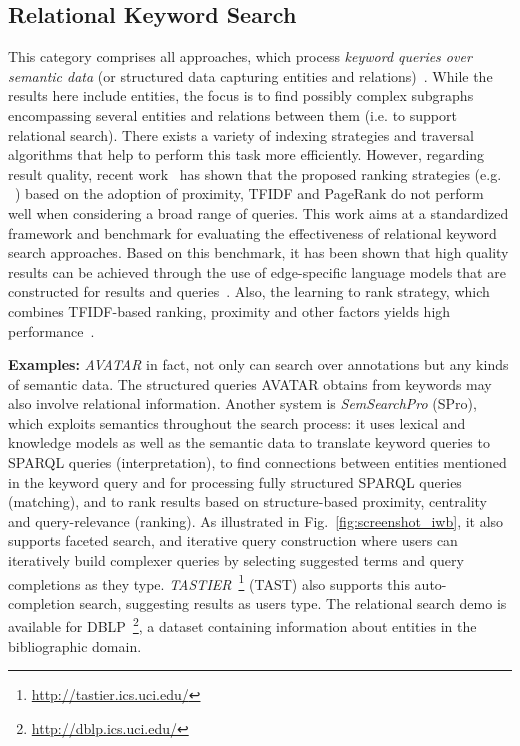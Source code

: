 \subsection{Relational Keyword Search}
This category comprises all approaches, which process \emph{keyword queries over semantic data} (or structured data capturing entities and relations)~\cite{DBLP:conf/icde/TranWRC09,DBLP:conf/cikm/LadwigT11,DBLP:conf/sigmod/LiOFWZ08}. While the results here include entities, the focus is to find possibly complex subgraphs encompassing several entities and relations between them (i.e. to support relational search). There exists a variety of indexing strategies and traversal algorithms that help to perform this task more efficiently. However, regarding result quality, recent work~\cite{DBLP:conf/cikm/CoffmanW10} has shown that the proposed ranking strategies (e.g. ~\cite{DBLP:conf/icde/TranWRC09,DBLP:conf/sigmod/LiuYMC06}) based on the adoption of proximity, TFIDF and PageRank do not perform well when considering a broad range of queries. This work aims at a standardized framework and benchmark for evaluating the effectiveness of relational keyword search approaches. Based on this benchmark, it has been shown that high quality results can be achieved through the use of edge-specific language models that are constructed for results and queries~\cite{DBLP:conf/cikm/BicerTN11}. Also, the learning to rank strategy, which combines TFIDF-based ranking, proximity and other factors yields high performance~\cite{DBLP:conf/cikm/CoffmanW11}. 

\textbf{Examples:} \emph{AVATAR} in fact, not only can search over annotations but any kinds of semantic data. The structured queries AVATAR obtains from keywords may also involve relational information. Another system is \emph{SemSearchPro} (SPro), which exploits semantics throughout the search process: it uses lexical and knowledge models as well as the semantic data to translate keyword queries to SPARQL queries (interpretation), to find connections between entities mentioned in the keyword query and for processing fully structured SPARQL queries (matching), and to rank results based on structure-based proximity, centrality and query-relevance (ranking). As illustrated in Fig.~\ref{fig:screenshot_iwb}, it also supports faceted search, and iterative query construction where users can iteratively build complexer queries by selecting suggested terms and query completions as they type. \emph{TASTIER}~\footnote{\url{http://tastier.ics.uci.edu/}} (TAST) also supports this auto-completion search, suggesting results as users type. The relational search demo is available for DBLP~\footnote{\url{http://dblp.ics.uci.edu/}}, a dataset containing information about entities in the bibliographic domain. 

